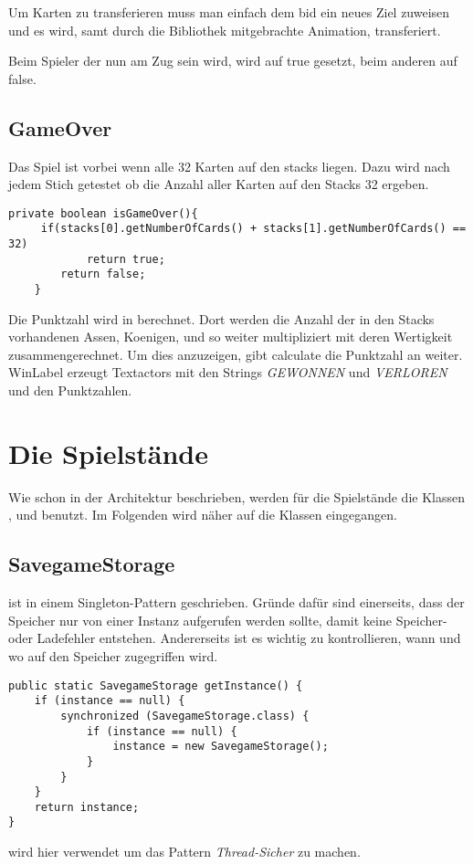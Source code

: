 Um Karten zu transferieren muss man einfach dem bid ein neues Ziel zuweisen und es wird, samt durch die Bibliothek mitgebrachte Animation, transferiert.

Beim Spieler der nun am Zug sein wird, wird  auf true gesetzt, beim anderen auf false.

\subsection{GameOver}

Das Spiel ist vorbei wenn alle 32 Karten auf den stacks liegen. Dazu wird nach jedem Stich getestet ob die Anzahl aller Karten auf den Stacks 32 ergeben.

\begin{lstlisting}[caption={isGameOver() Methode},captionpos=b]
    private boolean isGameOver(){
     if(stacks[0].getNumberOfCards() + stacks[1].getNumberOfCards() == 32)
            return true;
        return false;
    }
\end{lstlisting}

Die Punktzahl wird in  berechnet. Dort werden die Anzahl der in den Stacks vorhandenen Assen, Koenigen, und so weiter multipliziert mit deren Wertigkeit zusammengerechnet. Um dies anzuzeigen, gibt calculate die Punktzahl an  weiter. WinLabel erzeugt Textactors mit den Strings \emph{GEWONNEN} und \emph{VERLOREN} und den Punktzahlen. 

\section{Die Spielstände}
\sectionauthor{\leonard}

Wie schon in der Architektur beschrieben, werden für die Spielstände die Klassen 
,  und  benutzt.
Im Folgenden wird näher auf die Klassen eingegangen.

\subsection{SavegameStorage}
ist in einem Singleton-Pattern geschrieben. Gründe dafür sind einerseits, dass 
der Speicher nur von einer Instanz aufgerufen werden sollte, damit keine 
Speicher- oder Ladefehler entstehen. Andererseits ist es wichtig zu kontrollieren, 
wann und wo auf den Speicher zugegriffen wird. 
\begin{lstlisting}[caption={SavegameStorage Singleton},captionpos=b]
public static SavegameStorage getInstance() {
	if (instance == null) {
		synchronized (SavegameStorage.class) {
			if (instance == null) {
				instance = new SavegameStorage();
			}
		}
	}
	return instance;
}
\end{lstlisting}
 wird hier verwendet um das Pattern \emph{Thread-Sicher} zu 
machen.

